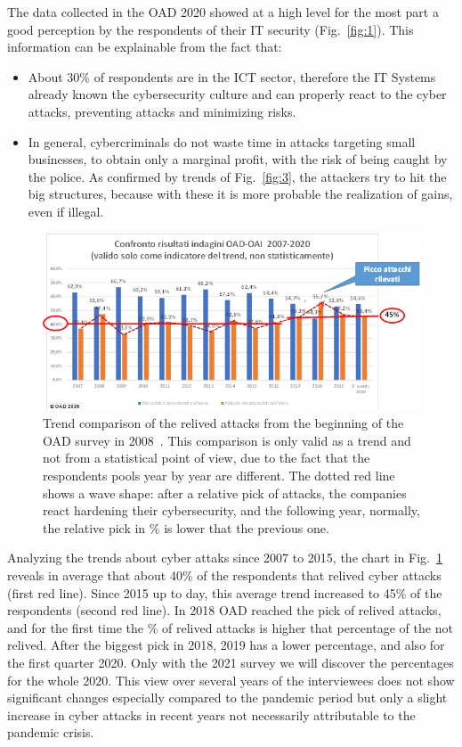 \documentclass{easychair}
\begin{document}
The data collected in the OAD 2020 showed at a high level for the most part a good perception by the respondents of their IT security (Fig.~\ref{fig:1}).
This information can be explainable from the fact that:
 
\begin{itemize}
\item About 30\% of respondents are in the ICT sector, therefore the IT Systems already known the cybersecurity culture and can properly react to the cyber attacks, preventing 
attacks and minimizing risks.

\item In general, cybercriminals do not waste time in attacks targeting small businesses, to obtain only a marginal profit, 
with the risk of being caught by the police.  As confirmed by trends of Fig.~\ref{fig:3}, the attackers try to hit the big structures,
 because with these it is more probable the realization of gains, even if illegal.
\end{itemize}

\begin{figure}
	\centering
		\includegraphics[width=1\textwidth]{pictures/fig2.png}
		\caption{Trend comparison of the relived attacks from the beginning of the OAD survey in 2008~\cite{oad20}. This comparison is only valid as a trend and not from a statistical point 
of view, due to the fact that the respondents pools year by year are different. The dotted red line shows a wave shape: after a relative pick of attacks, the companies react hardening their cybersecurity, and the following year, normally, 
the relative pick in \% is lower that the previous one.}
		\label{fig:2}
\end{figure}

Analyzing the trends about cyber attaks since 2007 to 2015, the chart in Fig.~\ref{fig:2} reveals in average that about 40\% of the respondents that relived cyber attacks 
(first red line). Since 2015 up to day, this average trend increased to 45\% of the respondents (second red line). 
In 2018 OAD reached the pick of relived attacks, and  for the first time  the \% of relived attacks is higher that percentage of the not relived. After the biggest pick 
in 2018, 2019 has a lower percentage, and also for the first quarter 2020. Only with the 2021 survey we will discover the percentages for the whole 2020. 
This view over several years of the interviewees does not show significant changes especially compared to the pandemic period but only a slight increase in cyber attacks 
in recent years not necessarily attributable to the pandemic crisis.
\end{document}
